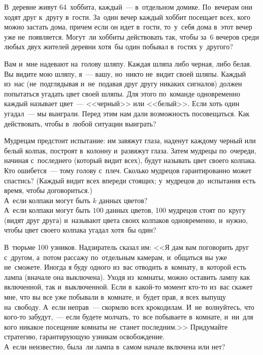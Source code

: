 


\begin{problems}

\item
В~деревне живут 64~хоббита, каждый~--- в~отдельном домике.
По~вечерам они ходят друг к~другу в~гости.
За~один вечер каждый хоббит посещает всех, кого можно застать дома, причем если
он идет в~гости, то~у~себя дома в~этот вечер уже не~появляется.
Могут~ли хоббиты действовать так, чтобы за~6 вечеров среди любых двух жителей
деревни хотя~бы один побывал в~гостях у~другого?

\item
Вам и~мне надевают на~голову шляпу.
Каждая шляпа либо черная, либо белая.
Вы видите мою шляпу, я~--- вашу, но~никто не~видит своей шляпы.
Каждый из~нас (не~подглядывая и~не~подавая друг другу никаких сигналов) должен
попытаться угадать цвет своей шляпы.
Для этого по~команде одновременно каждый называет цвет~--- <<черный>> или
<<белый>>.
Если хоть один угадал~--- мы выиграли.
Перед этим нам дали возможность посовещаться.
Как действовать, чтобы в~любой ситуации выиграть?

\item
\subproblem
Мудрецам предстоит испытание: им завяжут глаза, наденут каждому черный или
белый колпак, построят в~колонну и~развяжут глаза.
Затем мудрецы по~очереди, начиная с~последнего (который видит всех), будут
называть цвет своего колпака.
Кто ошибется~--- тому голову с~плеч.
Сколько мудрецов гарантированно может спастись?
(Каждый видит всех впереди стоящих;
у~мудрецов до~испытания есть время, чтобы договориться.)
\\
\subproblem
А~если колпаки могут быть $k$ данных цветов?
\\
\subproblemx{*}
А~если колпаки могут быть $100$ данных цветов, 100 мудрецов стоят по~кругу
(видят друг друга) и~называют цвета своих колпаков одновременно, и~нужно, чтобы
цвет своего колпака угадал хотя~бы один?

\item
\subproblem
В~тюрьме 100 узников.
Надзиратель сказал им:
<<Я дам вам поговорить друг с~другом, а~потом рассажу по~отдельным камерам,
и~общаться вы уже не~сможете.
Иногда я буду одного из~вас отводить в~комнату, в~которой есть лампа (вначале
она выключена).
Уходя из~комнаты, можно оставить лампу как включенной, так
и~выключенной.
Если в~какой-то момент кто-то из~вас скажет мне, что вы все уже побывали в~комнате, и~будет прав, я всех выпущу на~свободу.
А~если неправ~--- скормлю всех крокодилам.
И~не~волнуйтесь, что кого-то забудут,~--- если будете молчать, то~все побываете
в~комнате, и~ни~для кого никакое посещение комнаты не~станет последним.>>
Придумайте стратегию, гарантирующую узникам освобождение.
\\
\subproblem
А~если неизвестно, была~ли лампа в~самом начале включена или нет?


\end{problems}
